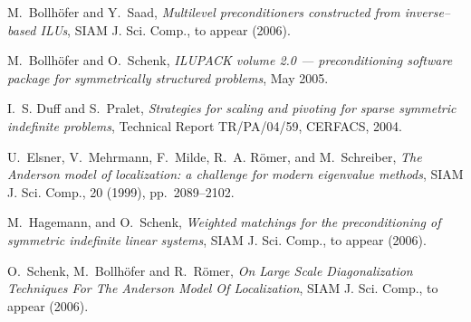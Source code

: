 \documentclass{report}
\begin{document}
\begin{thebibliography}{10}

 {\sc M.~Bollh\"ofer and Y.~Saad}, {\em Multilevel
preconditioners constructed from inverse--based {ILU}s}, SIAM J. Sci. Comp.,
to appear (2006).

 {\sc M.~Bollh\"ofer and O.~Schenk}, {\em
{I}{L}{U}{P}{A}{C}{K} volume 2.0 --- preconditioning software package for
symmetrically structured problems}, May 2005.

 {\sc I.~S. Duff and S.~Pralet}, {\em Strategies for scaling
and pivoting for sparse symmetric indefinite problems}, Technical Report
TR/PA/04/59, CERFACS, 2004.

 {\sc U.~Elsner, V.~Mehrmann, F.~Milde, R.~A. {R\"{o}mer},
and M.~Schreiber}, {\em The {Anderson} model of localization: a challenge
for modern eigenvalue methods}, SIAM J. Sci. Comp., 20 (1999),
pp.~2089--2102.

 {\sc M.~Hagemann, and O.~Schenk}, {\em Weighted matchings
for the preconditioning of symmetric indefinite linear systems}, SIAM
J. Sci. Comp., to appear (2006).

 {\sc O.~Schenk, M.~Bollh\"ofer and R.~R\"omer}, {\em On
Large Scale Diagonalization Techniques For The {Anderson} Model Of
Localization}, SIAM J. Sci. Comp., to appear (2006).

\end{thebibliography}
\end{document}
